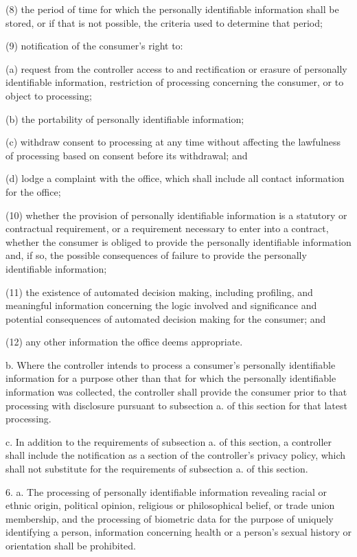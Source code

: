      (8)   the period of time for which the personally identifiable information shall be stored, or if that is not possible, the criteria used to determine that period;

     (9)   notification of the consumer's right to:

     (a)   request from the controller access to and rectification or erasure of personally identifiable information, restriction of processing concerning the consumer, or to object to processing;

     (b)   the portability of personally identifiable information;

     (c)   withdraw consent to processing at any time without affecting the lawfulness of processing based on consent before its withdrawal; and

     (d)   lodge a complaint with the office, which shall include all contact information for the office;

     (10) whether the provision of personally identifiable information is a statutory or contractual requirement, or a requirement necessary to enter into a contract, whether the consumer is obliged to provide the personally identifiable information and, if so, the possible consequences of failure to provide the personally identifiable information;

     (11) the existence of automated decision making, including profiling, and meaningful information concerning the logic involved and significance and potential consequences of automated decision making for the consumer; and

     (12) any other information the office deems appropriate.

     b.    Where the controller intends to process a consumer's personally identifiable information for a purpose other than that for which the personally identifiable information was collected, the controller shall provide the consumer prior to that processing with disclosure pursuant to subsection a. of this section for that latest processing.

     c.     In addition to the requirements of subsection a. of this section, a controller shall include the notification as a section of the controller's privacy policy, which shall not substitute for the requirements of subsection a. of this section.

 

     6.    a.  The processing of personally identifiable information revealing racial or ethnic origin, political opinion, religious or philosophical belief, or trade union membership, and the processing of biometric data for the purpose of uniquely identifying a person, information concerning health or a person's sexual history or orientation shall be prohibited.

